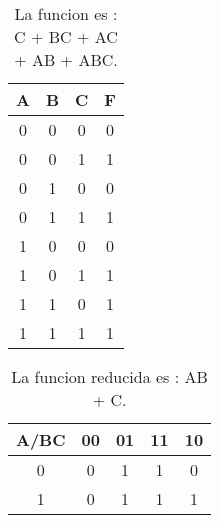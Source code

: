 \documentclass{article}
\begin{document}
\begin{table}[H]
  \centering
    \begin{tabular}{| c | c | c | c |}
      \hline \cellcolor{gray!25}A & \cellcolor{gray!25}B & \cellcolor{gray!25}C & \cellcolor{gray!25}F \\ \hline
      0 & 0 & 0 & \cellcolor{blue!10}0\\ \hline
      0 & 0 & 1 & \cellcolor{blue!25}1\\ \hline
      0 & 1 & 0 & \cellcolor{blue!10}0\\ \hline
      0 & 1 & 1 & \cellcolor{blue!25}1\\ \hline
      1 & 0 & 0 & \cellcolor{blue!10}0\\ \hline
      1 & 0 & 1 & \cellcolor{blue!25}1\\ \hline
      1 & 1 & 0 & \cellcolor{blue!25}1\\ \hline
      1 & 1 & 1 & \cellcolor{blue!25}1\\ \hline
    \end{tabular}
  \caption{La funcion es : C + BC + AC + AB + ABC.}
\end{table}

\begin{table}[H]
  \centering
    \begin{tabular}{| c | c | c | c | c |}
      \hline \cellcolor{gray!25}A/BC & \cellcolor{gray!25}00 & \cellcolor{gray!25}01 & \cellcolor{gray!25}11 & \cellcolor{gray!25}10 \\ \hline
      \cellcolor{gray!25}0 & 0 & \cellcolor{blue!25}1 & \cellcolor{blue!25}1 & 0\\ \hline
      \cellcolor{gray!25}1 & 0 & \cellcolor{blue!25}1 & \cellcolor{blue!25}1 & \cellcolor{blue!25}1\\ \hline
    \end{tabular}
  \caption{La funcion reducida es : AB + C.}
\end{table}
\end{document}
